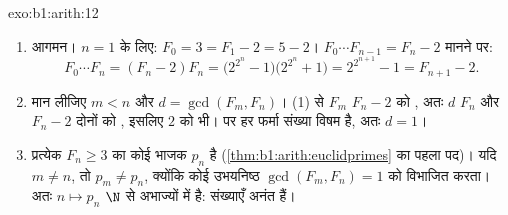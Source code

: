 \begin{solution}{exo:b1:arith:12}
\begin{enumerate}
  \item आगमन। $n = 1$ के लिए: $F_0 = 3 = F_1 - 2 = 5 - 2$। $F_0\cdots
  F_{n-1} = F_n - 2$ मानने पर:
        \[
        F_0 \cdots F_n = (F_n - 2)F_n
        = \bigl(2^{2^n} - 1\bigr)\bigl(2^{2^n} + 1\bigr)
        = 2^{2^{n+1}} - 1 = F_{n+1} - 2 .
        \]
  \item मान लीजिए $m < n$ और $d = \gcd(F_m, F_n)$। (1) से $F_m$ $F_n - 2$ को
  , अतः $d$ $F_n$ और $F_n - 2$ दोनों को ,
  इसलिए $2$ को भी। पर हर फर्मा संख्या विषम है, अतः $d = 1$।
  \item प्रत्येक $F_n \geq 3$ का कोई  भाजक $p_n$ है
  (\cref{thm:b1:arith:euclidprimes} का पहला पद)। यदि $m \neq n$, तो $p_m
  \neq p_n$, क्योंकि कोई उभयनिष्ठ  $\gcd(F_m, F_n) = 1$ को विभाजित
  करता। अतः  $n \mapsto p_n$ $\N$ से अभाज्यों में  है:
   संख्याएँ अनंत हैं।
\end{enumerate}
\end{solution}

